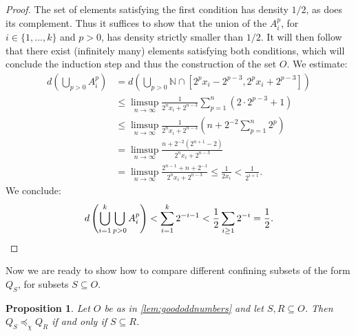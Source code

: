 \documentclass[reqno,12pt]{amsart}\setcounter{tocdepth}{1}
\newtheorem{proposition}[theorem]{Proposition}
\theoremstyle{definition}
\newcommand{\N}{\mathbb{N}}
\numberwithin{equation}{section}
\begin{document}
\begin{proof}
    The set of elements satisfying the first condition has density $1/2$, as does its complement. Thus it suffices to show that the union of the $A_i^p$, for $i \in \{1, \ldots, k\}$ and $p > 0$, has density strictly smaller than $1/2$. It will then follow that there exist (infinitely many) elements satisfying both conditions, which will conclude the induction step and thus the construction of the set $O$. We estimate:
    \begin{align*}
        d\left(\bigcup_{p > 0} A_i^p\right) &= d\left( \bigcup_{p > 0} \N \cap [2^p x_i - 2^{p-3}, 2^p x_i + 2^{p-3}] \right) \\
        &\leq \limsup\limits_{n \to \infty} \frac{1}{2^n x_i + 2^{n-3}} \sum\limits_{p = 1}^n (2 \cdot 2^{p-3} + 1) \\
        &\leq \limsup\limits_{n \to \infty} \frac{1}{2^n x_i + 2^{n-3}} \left( n + 2^{-2} \sum\limits_{p = 1}^n 2^p \right) \\
        &= \limsup\limits_{n \to \infty} \frac{n + 2^{-2}(2^{n+1} - 2)}{2^n x_i + 2^{n-3}} \\
        &= \limsup\limits_{n \to \infty} \frac{2^{n-1} + n + 2^{-1}}{2^n x_i + 2^{n-3}} \leq \frac{1}{2x_i} < \frac{1}{2^{i+1}}.
    \end{align*}
We conclude:
    \[d\left(\bigcup\limits_{i = 1}^k \bigcup\limits_{p > 0} A_i^p \right) < \sum\limits_{i = 1}^k 2^{-i - 1} < \frac{1}{2} \sum\limits_{i \geq 1} 2^{-i} = \frac{1}{2}.\qedhere\]
\end{proof}

Now we are ready to show how to compare different confining subsets of the form $Q_S$, for subsets $S \subseteq O$.

\begin{proposition}
\label{prop:nonlamplike:compare}
    Let $O$ be as in \cref{lem:goododdnumbers} and let $S, R \subseteq O$. Then $Q_S \preceq_\chi Q_R$ if and only if $S \subseteq R$.
\end{proposition}
\end{document}
